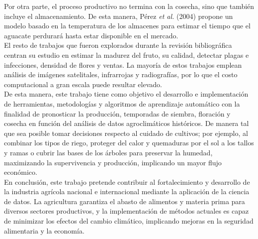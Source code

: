 Por otra parte, el proceso productivo no termina con la cosecha, sino que también incluye el almacenamiento. De esta manera, Pérez \textit{et al.} (2004) \cite{Perez_2004} propone un modelo basado en la temperatura de los almacenes para estimar el tiempo que el aguacate perdurará hasta estar disponible en el mercado.\\

El resto de trabajos que fueron explorados durante la revisión bibliográfica centran su estudio en estimar la madurez del fruto, su calidad, detectar plagas e infecciones, densidad de flores y ventas. La mayoría de estos trabajos emplean análisis de imágenes satelitales, infrarrojas y radiografías, por lo que el costo computacional a gran escala puede resultar elevado. \\


De esta manera, este trabajo tiene como objetivo el desarrollo e implementación de herramientas, metodologías y algoritmos de aprendizaje automático con la finalidad de pronosticar la producción, temporadas de siembra, floración y cosecha en función del análisis de datos agroclimáticos históricos.  De manera tal que sea posible tomar decisiones respecto al cuidado de cultivos; por ejemplo, al combinar los tipos de riego, proteger del calor y quemaduras por el sol a los tallos y ramas  o cubrir las bases de los árboles para preservar la humedad, maximizando la supervivencia y producción, implicando un mayor flujo económico.\\

En conclusión, este trabajo pretende contribuir al fortalecimiento y desarrollo de la industria agrícola nacional e internacional mediante la aplicación de la ciencia de datos. La agricultura garantiza el abasto de alimentos y materia prima para diversos sectores productivos, y la implementación de métodos actuales es capaz de minimizar los efectos del cambio climático, implicando mejoras en la seguridad alimentaria y la economía.

\fi